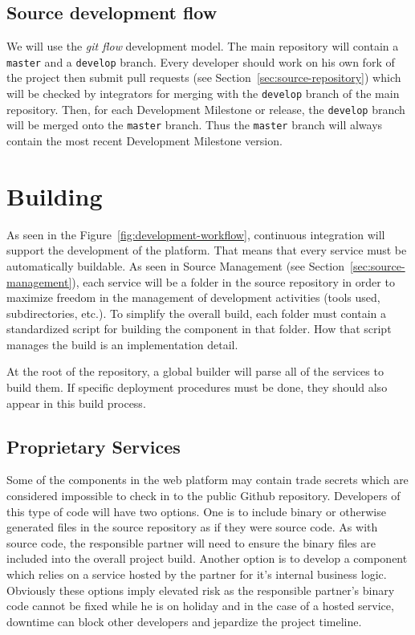 \subsection{Source development flow}
\label{sec:source-development-flow}

We will use the \emph{git flow}\cite{kreeftmeijer:2010} development model. The main repository will
contain a \texttt{master} and a \texttt{develop} branch. Every developer should work on his
own fork of the project then submit pull requests (see Section~\ref{sec:source-repository})
which will be checked by integrators for merging with the \texttt{develop} branch of the main
repository. Then, for each Development Milestone or release, the \texttt{develop} branch will
be merged onto the \texttt{master} branch. Thus the \texttt{master} branch will always contain
the most recent Development Milestone version.

\section{Building}
\label{sec:building}

As seen in the Figure~\ref{fig:development-workflow}, continuous integration will support the
development of the platform. That means that every service must be automatically buildable.
As seen in Source Management (see Section~\ref{sec:source-management}), each service will be a
folder in the source repository in order to maximize freedom in the management of development
activities (tools used, subdirectories, etc.). To simplify the overall build, each folder must
contain a standardized script for building the component in that folder. How that script manages
the build is an implementation detail.

At the root of the repository, a global builder will parse all of the services to build them.
If specific deployment procedures must be done, they should also appear in this build process.

\subsection{Proprietary Services}
\label{sec:proprietary-services}

Some of the components in the \learnpad web platform may contain trade secrets which are
considered impossible to check in to the public Github repository. Developers of this type of
code will have two options. One is to include binary or otherwise generated files in the source
repository as if they were source code. As with source code, the responsible partner will need
to ensure the binary files are included into the overall project build. Another option is to
develop a component which relies on a service hosted by the partner for it's internal business
logic. Obviously these options imply elevated risk as the responsible partner's binary code
cannot be fixed while he is on holiday and in the case of a hosted service, downtime can block
other developers and jepardize the project timeline.

